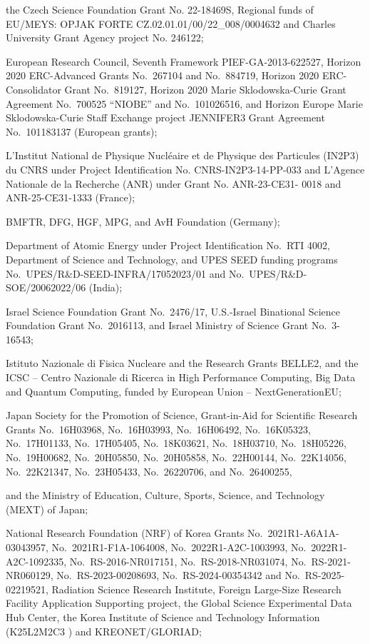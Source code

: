 the Czech Science Foundation Grant No. 22-18469S,  Regional funds of EU/MEYS: OPJAK
FORTE CZ.02.01.01/00/22\_008/0004632
and
Charles University Grant Agency project No. 246122;

European Research Council, Seventh Framework PIEF-GA-2013-622527,
Horizon 2020 ERC-Advanced Grants No.~267104 and No.~884719,
Horizon 2020 ERC-Consolidator Grant No.~819127,
Horizon 2020 Marie Sklodowska-Curie Grant Agreement No.~700525 ``NIOBE''
and
No.~101026516,
and
Horizon Europe Marie Sklodowska-Curie Staff Exchange project JENNIFER3 Grant Agreement No.~101183137 (European grants);

L’Institut National de Physique Nucl\'eaire et de Physique des
Particules (IN2P3) du CNRS under Project Identification No.
CNRS-IN2P3-14-PP-033
and L’Agence Nationale de la Recherche (ANR) under Grant No. ANR-23-CE31-
0018 and ANR-25-CE31-1333 (France);

BMFTR, DFG, HGF, MPG, and AvH Foundation (Germany);

Department of Atomic Energy under Project Identification No.~RTI 4002,
Department of Science and Technology,
and
UPES SEED funding programs
No.~UPES/R\&D-SEED-INFRA/17052023/01 and
No.~UPES/R\&D-SOE/20062022/06 (India);

Israel Science Foundation Grant No.~2476/17,
U.S.-Israel Binational Science Foundation Grant No.~2016113, and
Israel Ministry of Science Grant No.~3-16543;

Istituto Nazionale di Fisica Nucleare and the Research Grants BELLE2,
and
the ICSC – Centro Nazionale di Ricerca in High Performance Computing, Big Data and Quantum Computing, funded by European Union – NextGenerationEU;

Japan Society for the Promotion of Science, Grant-in-Aid for Scientific Research Grants
No.~16H03968,
No.~16H03993,
No.~16H06492,
No.~16K05323,
No.~17H01133,
No.~17H05405,
No.~18K03621,
No.~18H03710,
No.~18H05226,
No.~19H00682,
No.~20H05850,
No.~20H05858,
No.~22H00144,
No.~22K14056,
No.~22K21347,
No.~23H05433,
No.~26220706,
and
No.~26400255,

and
the Ministry of Education, Culture, Sports, Science, and Technology (MEXT) of Japan;

National Research Foundation (NRF) of Korea Grants
No.~2021R1-A6A1A-03043957,
No.~2021R1-F1A-1064008,
No.~2022R1-A2C-1003993,
No.~2022R1-A2C-1092335,
No.~RS-2016-NR017151,
No.~RS-2018-NR031074,
No.~RS-2021-NR060129,
No.~RS-2023-00208693,
No.~RS-2024-00354342
and
No.~RS-2025-02219521,
Radiation Science Research Institute,
Foreign Large-Size Research Facility Application Supporting project,
the Global Science Experimental Data Hub Center, the Korea Institute of Science and
Technology Information (K25L2M2C3 )
and
KREONET/GLORIAD;


